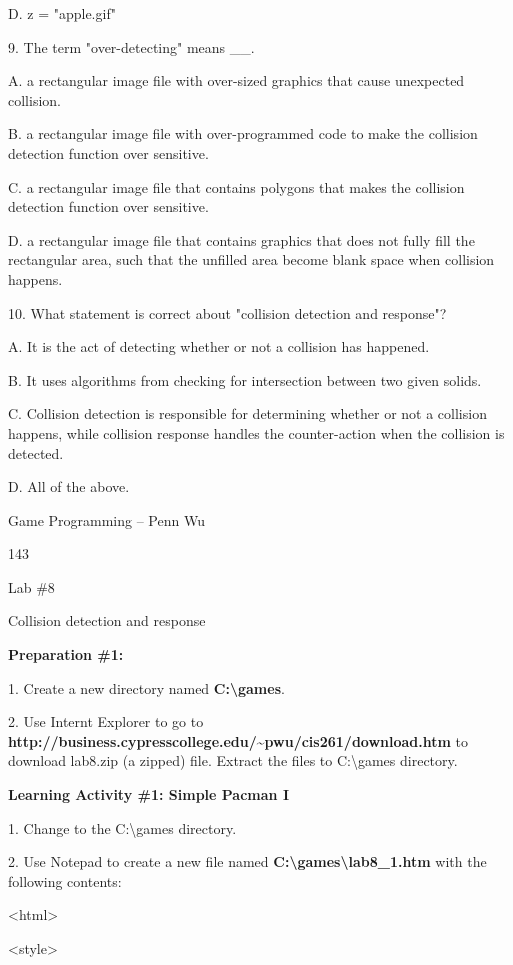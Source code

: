 \documentclass[
]{article}
\begin{document}
D. z = "apple.gif"

9. The term "over-detecting" means \_\_.

A. a rectangular image file with over-sized graphics that cause
unexpected collision.

B. a rectangular image file with over-programmed code to make the
collision detection function over sensitive.

C. a rectangular image file that contains polygons that makes the
collision detection function over sensitive.

D. a rectangular image file that contains graphics that does not fully
fill the rectangular area, such that the unfilled area become blank
space when collision happens.

10. What statement is correct about "collision detection and response"?

A. It is the act of detecting whether or not a collision has happened.

B. It uses algorithms from checking for intersection between two given
solids.

C. Collision detection is responsible for determining whether or not a
collision happens, while collision response handles the counter-action
when the collision is detected.

D. All of the above.

Game Programming -- Penn Wu

143

\protect\hypertarget{index_split_009.htmlux5cux23p144}{}{}

Lab \#8

Collision detection and response

\textbf{Preparation \#1:}

1. Create a new directory named \textbf{C:\textbackslash games}.

2. Use Internt Explorer to go to
\textbf{http://business.cypresscollege.edu/\textasciitilde pwu/cis261/download.htm}
to download lab8.zip (a zipped) file. Extract the files to
C:\textbackslash games directory.

\textbf{Learning Activity \#1: Simple Pacman I}

1. Change to the C:\textbackslash games directory.

2. Use Notepad to create a new file named
\textbf{C:\textbackslash games\textbackslash lab8\_1.htm} with the
following contents:

\textless html\textgreater{}

\textless style\textgreater{}
\end{document}
